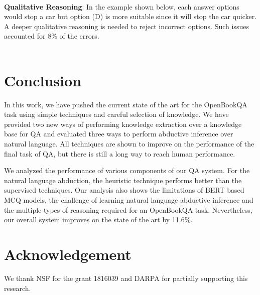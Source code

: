 \documentclass[11pt,a4paper]{article}
\begin{document}
\noindent
    \\
    
\textbf{Qualitative Reasoning}: In the example shown below, each answer options would stop a car but option (D)  is more suitable since it will stop the car quicker. A deeper qualitative reasoning is needed to reject incorrect options.  Such issues accounted for 8\% of the errors. \\




    \noindent
     \\
    
\section{Conclusion}
In this work, we have pushed the current state of the art for the OpenBookQA task using simple techniques and careful selection of knowledge. We have provided two new ways of performing knowledge extraction over a knowledge base for QA and evaluated three ways to perform abductive inference over natural language. All techniques are shown to improve on the performance of the final task of QA, but there is still a long way to reach human performance. 



We analyzed the performance of various components of our QA system. For the natural language abduction, the heuristic technique performs better than the supervised techniques. Our analysis also shows the limitations of BERT based MCQ models, the challenge of learning natural language abductive inference and the multiple types of reasoning required for an OpenBookQA task. Nevertheless, our overall system improves on the state of the art by 11.6\%.




\section{Acknowledgement}
We thank NSF for the grant 1816039 and DARPA for partially supporting this research.




\appendix
\end{document}
